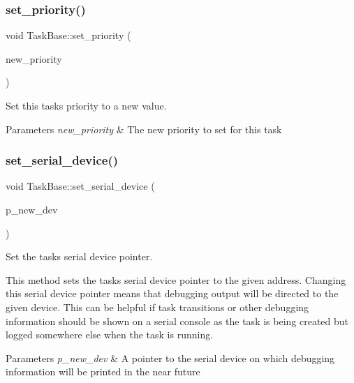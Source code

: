 \subsubsection{\texorpdfstring{set\+\_\+priority()}{set\_priority()}}
{\footnotesize\ttfamily void Task\+Base\+::set\+\_\+priority (\begin{DoxyParamCaption}\item[{port\+B\+A\+S\+E\+\_\+\+T\+Y\+PE}]{new\+\_\+priority }\end{DoxyParamCaption})\hspace{0.3cm}{\ttfamily [inline]}}



Set this task\textquotesingle{}s priority to a new value. 


\begin{DoxyParams}{Parameters}
{\em new\+\_\+priority} & The new priority to set for this task \\
\hline
\end{DoxyParams}
\mbox{\label{class_task_base_ad088ca82db29301b019b1efde85156be}} 
\subsubsection{\texorpdfstring{set\+\_\+serial\+\_\+device()}{set\_serial\_device()}}
{\footnotesize\ttfamily void Task\+Base\+::set\+\_\+serial\+\_\+device (\begin{DoxyParamCaption}\item[{\mbox{\hyperlink{classemstream}{emstream}} $\ast$}]{p\+\_\+new\+\_\+dev }\end{DoxyParamCaption})\hspace{0.3cm}{\ttfamily [inline]}}



Set the task\textquotesingle{}s serial device pointer. 

This method sets the task\textquotesingle{}s serial device pointer to the given address. Changing this serial device pointer means that debugging output will be directed to the given device. This can be helpful if task transitions or other debugging information should be shown on a serial console as the task is being created but logged somewhere else when the task is running. 
\begin{DoxyParams}{Parameters}
{\em p\+\_\+new\+\_\+dev} & A pointer to the serial device on which debugging information will be printed in the near future \\
\hline
\end{DoxyParams}
\mbox{\label{class_task_base_af70bf7c9cb6dfccdb1dbf41b7c6d2ecf}} 
